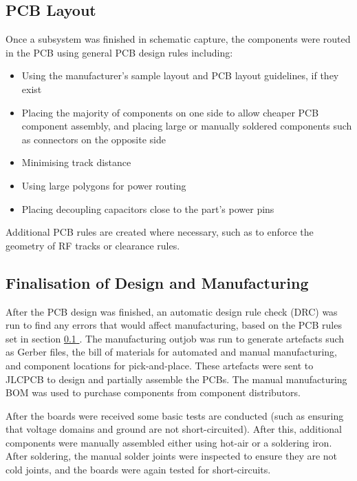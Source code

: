 \documentclass{report}
\newcommand*{\secref}[1]{section \hyperref[{#1}]{\ref*{#1} \nameref*{#1}}}
\begin{document}
\subsection{PCB Layout}
\label{sec:pcb-layout}

Once a subsystem was finished in schematic capture, the components were routed in the PCB using general PCB design rules including:

\begin{itemize}
  \item Using the manufacturer's sample layout and PCB layout guidelines, if they exist
  \item Placing the majority of components on one side to allow cheaper PCB component assembly, and placing large or manually soldered components such as connectors on the opposite side
  \item Minimising track distance
  \item Using large polygons for power routing
  \item Placing decoupling capacitors close to the part's power pins
\end{itemize}


Additional PCB rules are created where necessary, such as to enforce the geometry of RF tracks or clearance rules.

\subsection{Finalisation of Design and Manufacturing}

After the PCB design was finished, an automatic design rule check (DRC) was run to find any errors that would affect manufacturing, based on the PCB rules set in \secref{sec:pcb-layout}. The manufacturing outjob was run to generate artefacts such as Gerber files, the bill of materials for automated and manual manufacturing, and component locations for pick-and-place. These artefacts were sent to JLCPCB to design and partially assemble the PCBs. The manual manufacturing BOM was used to purchase components from component distributors.

After the boards were received some basic tests are conducted (such as ensuring that voltage domains and ground are not short-circuited). After this, additional components were manually assembled either using hot-air or a soldering iron. After soldering, the manual solder joints were inspected to ensure they are not cold joints, and the boards were again tested for short-circuits.
\end{document}

